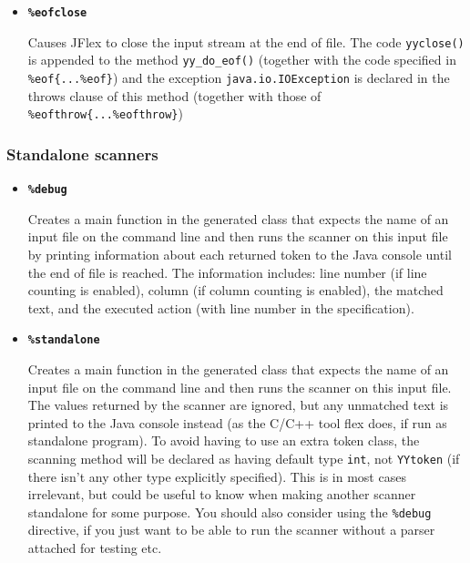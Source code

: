\documentclass[11pt]{scrartcl}
\begin{document}
\begin{itemize}
\label{eofclose}
\item{\bf \texttt{\%eofclose}}
  
  Causes JFlex to close the input stream at the end of file. The code
  \texttt{yyclose()} is appended to the method \texttt{yy\_do\_eof()}
  (together with the code specified in \verb+%eof{...%eof}+) and
  the exception \texttt{java.io.IOException} is declared in the throws
  clause of this method (together with those of 
  \verb+%eofthrow{...%eofthrow}+)

\end{itemize}

\subsubsection{Standalone scanners\label{Standalone}}
\begin{itemize}
\item
{\bf \texttt{\%debug}}

Creates a main function in the generated class that expects the name
of an input file on the command line and then runs the scanner on this
input file by printing information about each returned token to the Java 
console until the end of file is reached. The information includes:
line number (if line counting is enabled), column (if column counting is enabled),
the matched text, and the executed action (with line number in the specification).
 
\item
{\bf \texttt{\%standalone}}

Creates a main function in the generated class that expects the name
of an input file on the command line and then runs the scanner on this
input file. The values returned by the scanner are ignored, but any unmatched
text is printed to the Java console instead (as the C/C++ tool flex does, if
run as standalone program). To avoid having to use an extra token class, the
scanning method will be declared as having default type \texttt{int}, not \texttt{YYtoken}
(if there isn't any other type explicitly specified).
This is in most cases irrelevant, but could be useful to know when making
another scanner standalone for some purpose. You should also consider using
the \texttt{\%debug} directive, if you just want to be able to run the scanner
without a parser attached for testing etc.

\end{itemize}
\end{document}
